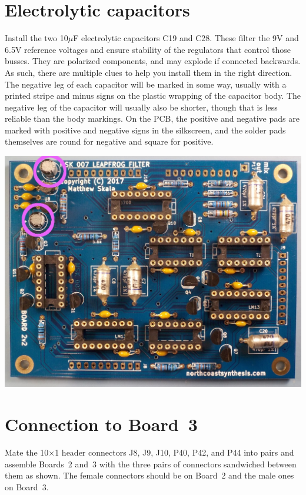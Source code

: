 \newpage

\section{Electrolytic capacitors}

Install the two 10$\mu$F electrolytic capacitors C19 and C28.  These filter
the 9V and 6.5V reference voltages and ensure stability of the regulators
that control those busses.  They are polarized components, and may explode
if connected backwards.  As such, there are multiple clues to help you
install them in the right direction.  The negative leg of each capacitor
will be marked in some way, usually with a printed stripe and minus signs on
the plastic wrapping of the capacitor body.  The negative leg of the
capacitor will usually also be shorter, though that is less reliable than
the body markings.  On the PCB, the positive and negative pads are marked
with positive and negative signs in the silkscreen, and the solder pads
themselves are round for negative and square for positive.

\noindent\includegraphics[width=\linewidth]{cap-10u2.jpg}

\pagebreak

\section{Connection to Board~3}

Mate the 10$\times$1 header connectors J8, J9, J10, P40, P42, and P44 into
pairs and assemble Boards~2 and~3 with the three pairs of connectors
sandwiched between them as shown.  The female connectors should be on
Board~2 and the male ones on Board~3.

